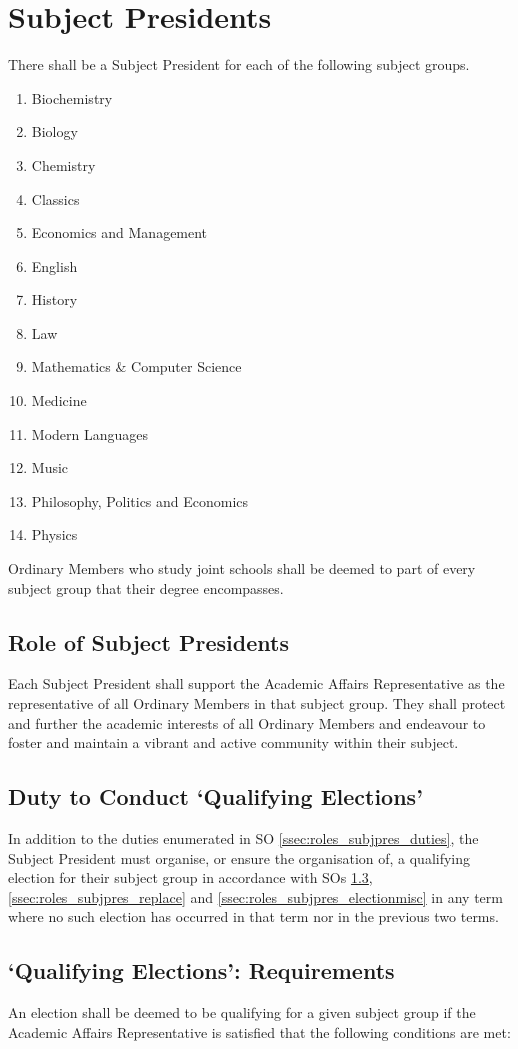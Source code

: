 \section{Subject Presidents} \label{sec:roles_subjpres}
\npara There shall be a Subject President for each of the following subject groups.	
\begin{enumerate}
	\item Biochemistry
	\item Biology
	\item Chemistry
	\item Classics
	\item Economics and Management
	\item English
	\item History
	\item Law
	\item Mathematics \& Computer Science
	\item Medicine
	\item Modern Languages
	\item Music
	\item Philosophy, Politics and Economics
	\item Physics
\end{enumerate}
Ordinary Members who study joint schools shall be deemed to part of every subject group that their degree encompasses.
\subsection{Role of Subject Presidents}
Each Subject President shall support the Academic Affairs Representative as the representative of all Ordinary Members in that subject group. They shall protect and further the academic interests of all Ordinary Members and endeavour to foster and maintain a vibrant and active community within their subject.
\subsection{Duty to Conduct `Qualifying Elections'} \label{ssec:roles_subjpres_electionduty}
In addition to the duties enumerated in SO \ref{ssec:roles_subjpres_duties}, the Subject President must organise, or ensure the organisation of, a qualifying election for their subject group in accordance with SOs \ref{ssec:roles_subjpres_electionreq}, \ref{ssec:roles_subjpres_replace} and \ref{ssec:roles_subjpres_electionmisc} in any term where no such election has occurred in that term nor in the previous two terms.
\subsection{`Qualifying Elections': Requirements} \label{ssec:roles_subjpres_electionreq}
An election shall be deemed to be qualifying for a given subject group if the Academic Affairs Representative is satisfied that the following conditions are met:

